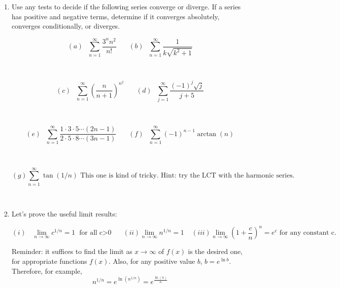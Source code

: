 \documentclass[11pt, oneside]{article}   	%
\title{}
\author{Week 11 discussion problems}
\date{}							%
\begin{document}
\maketitle

\begin{enumerate}

\item Use any tests to decide if the following series converge or diverge. If a series has positive and negative terms, determine if it converges absolutely, converges conditionally, or diverges.
 
$$(a) \ \ \ \sum_{n=1}^{\infty} \dfrac{3^n n^2}{n!} \ \ \ \ \ \ \ \  (b) \ \ \ \sum_{n=1}^{\infty} \dfrac{1}{k \sqrt{k^2+1}} $$

\

$$(c) \ \ \ \sum_{n=1}^{\infty}  \left( \dfrac{n}{n+1} \right) ^{n^2} \ \ \ \ \ \ \ \  (d) \ \ \ \sum_{j=1}^{\infty} \dfrac{ (-1)^j \sqrt{j}}{j+5}$$
 
\

 
$$(e) \ \ \ \sum_{n=1}^{\infty}  \dfrac{1 \cdot 3 \cdot 5 \cdots (2n-1)}{2 \cdot 5 \cdot 8 \cdots (3n-1)} \ \ \ \ \ \ \ \  (f) \ \ \ \sum_{n=1}^{\infty} (-1)^{n-1}\arctan(n)$$

\

$$ (g) \sum_{n=1}^{\infty} \tan(1/n) \textrm{ This one is kind of tricky. Hint: try the LCT with the harmonic series.} $$


\

\item Let's prove  the useful limit results:

$$(i) \ \ \ \  \lim_{n \to \infty} c^{1/n} = 1 \textrm{ for all c$>$0 } \ \ \ \ \ (ii) \lim_{n \to \infty} n^{1/n} = 1 \ \ \ \ \ (iii)  \lim_{n \to \infty} \left( 1+ \dfrac{c}{n} \right)^n =e^c \textrm{ for any constant c.}$$

Reminder: it suffices to find the limit as $x \to \infty$ of $f(x)$ is the desired one, for appropriate functions $f(x)$. Also, for any positive value $b$, $b=e^{\ln b}$. Therefore, for example, 
$$n^{1/n}= e^{\ln(n^{1/n})}=e^{\frac{\ln(n)}{n}}$$
\end{enumerate}
\end{document}
